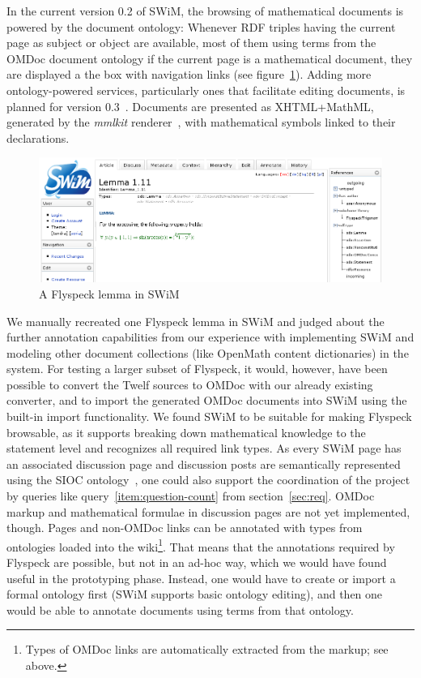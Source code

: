 \documentclass{llncs}
\begin{document}
In the current version 0.2 of SWiM, the browsing of mathematical documents is powered by
the document ontology: Whenever RDF triples having the current page as subject or object
are available, most of them using terms from the OMDoc document ontology if the current
page is a mathematical document, they are displayed a the box with navigation links (see
figure~\ref{fig:swim-lemma}).  Adding more ontology-powered services, particularly ones
that facilitate editing documents, is planned for version
0.3~\cite{swim-roadmap,Lange:SWiMSciColl07}.  Documents are presented as XHTML+MathML,
generated by the \textit{mmlkit} renderer~\cite{mmlkit:web}, with mathematical symbols
linked to their declarations.

\begin{figure}
  \centering
  \includegraphics[width=.7\textwidth]{swim-lemma}
  \caption{A Flyspeck lemma in SWiM}
  \label{fig:swim-lemma}
\end{figure}

We manually recreated one Flyspeck lemma in SWiM and judged about the further annotation
capabilities from our experience with implementing SWiM and modeling other document
collections (like OpenMath content dictionaries) in the system. For
testing a larger subset of Flyspeck, it would, however, have been possible to convert the
Twelf sources to OMDoc with our already existing converter, and to import the generated
OMDoc documents into SWiM using the built-in import functionality.  We found SWiM to be
suitable for making Flyspeck browsable, as it supports breaking down mathematical
knowledge to the statement level and recognizes all required link types.  As every SWiM
page has an associated discussion page and discussion posts are semantically represented
using the SIOC ontology~\cite{SIOC:web}, one could also support the coordination of the
project by queries like query~\ref{item:question-count} from section~\ref{sec:req}.  OMDoc
markup and mathematical formulae in discussion pages are not yet implemented, though.
Pages and non-OMDoc links can be annotated with types from ontologies loaded into the
wiki\footnote{Types of OMDoc links are automatically extracted from the markup; see
  above.}.  That means that the annotations required by Flyspeck are possible, but not in
an ad-hoc way, which we would have found useful in the prototyping phase.  Instead, one
would have to create or import a formal ontology first (SWiM supports basic ontology
editing), and then one would be able to annotate documents using terms from that ontology.
\end{document}

